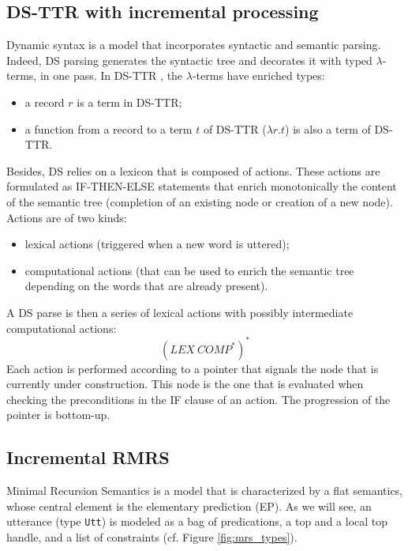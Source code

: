 \documentclass[11pt]{article}
\begin{document}
			
			
			
			
		

		
		\subsection{DS-TTR with incremental processing}
			Dynamic syntax \cite{kempson2001} is a model that incorporates syntactic and semantic parsing. Indeed, DS parsing generates the syntactic tree and decorates it with typed $\lambda$-terms, in one pass. In DS-TTR \cite{hough2011,hough2015}, the $\lambda$-terms have enriched types:
			\begin{itemize}
				\item a record $r$ is a term in DS-TTR;
				\item a function from a record to a term $t$ of DS-TTR ($\lambda r. t$) is also a term of DS-TTR.
			\end{itemize}
			Besides, DS relies on a lexicon that is composed of actions. These actions are formulated as IF-THEN-ELSE statements that enrich monotonically the content of the semantic tree (completion of an existing node or creation of a new node). Actions are of two kinds:
			\begin{itemize}
				\item lexical actions (triggered when a new word is uttered);
				\item computational actions (that can be used to enrich the semantic tree depending on the words that are already present).
			\end{itemize}
			A DS parse is then a series of lexical actions with possibly intermediate computational actions:
			\begin{equation*}
				(LEX \ COMP^*)^* 
			\end{equation*}
			Each action is performed according to a pointer that signals the node that is currently under construction. This node is the one that is evaluated when checking the preconditions in the IF clause of an action. The progression of the pointer is bottom-up.

		\subsection{Incremental RMRS}\label{RMRS}
			Minimal Recursion Semantics \cite{copestake2005} is a model that is characterized by a flat semantics, whose central element is the elementary prediction (EP). As we will see, an utterance (type \texttt{Utt}) is modeled as a bag of predications, a top and a local top handle, and a list of constraints (cf. Figure \ref{fig:mrs_types}).
\end{document}
